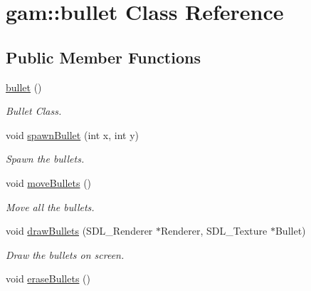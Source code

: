 \hypertarget{classgam_1_1bullet}{\section{gam\+:\+:bullet Class Reference}
\label{classgam_1_1bullet}
}
\subsection*{Public Member Functions}
\begin{DoxyCompactItemize}
\item 
\hyperlink{classgam_1_1bullet_a17ac5481ac64bdef100889ae7da5d197}{bullet} ()
\begin{DoxyCompactList}\small\item\em Bullet Class. \end{DoxyCompactList}\item 
\hypertarget{classgam_1_1bullet_a574832d764628a1934e05e83ab2f6df2}{void \hyperlink{classgam_1_1bullet_a574832d764628a1934e05e83ab2f6df2}{spawn\+Bullet} (int x, int y)}\label{classgam_1_1bullet_a574832d764628a1934e05e83ab2f6df2}

\begin{DoxyCompactList}\small\item\em Spawn the bullets. \end{DoxyCompactList}\item 
\hypertarget{classgam_1_1bullet_aabb447e5ab591306b94f29855fb54c5b}{void \hyperlink{classgam_1_1bullet_aabb447e5ab591306b94f29855fb54c5b}{move\+Bullets} ()}\label{classgam_1_1bullet_aabb447e5ab591306b94f29855fb54c5b}

\begin{DoxyCompactList}\small\item\em Move all the bullets. \end{DoxyCompactList}\item 
\hypertarget{classgam_1_1bullet_a45ba4470b916d5254818e822133e98a5}{void \hyperlink{classgam_1_1bullet_a45ba4470b916d5254818e822133e98a5}{draw\+Bullets} (S\+D\+L\+\_\+\+Renderer $\ast$Renderer, S\+D\+L\+\_\+\+Texture $\ast$Bullet)}\label{classgam_1_1bullet_a45ba4470b916d5254818e822133e98a5}

\begin{DoxyCompactList}\small\item\em Draw the bullets on screen. \end{DoxyCompactList}\item 
\hypertarget{classgam_1_1bullet_a3367c93df5c017bb015900fedf152531}{void \hyperlink{classgam_1_1bullet_a3367c93df5c017bb015900fedf152531}{erase\+Bullets} ()}\label{classgam_1_1bullet_a3367c93df5c017bb015900fedf152531}


\end{DoxyCompactItemize}
